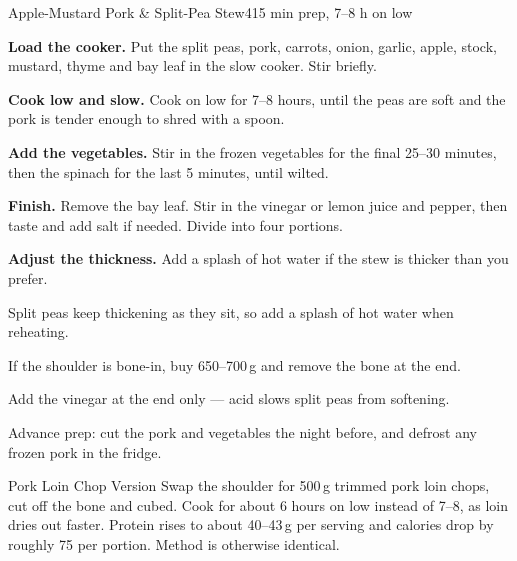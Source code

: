 \begin{recipebox}{Apple-Mustard Pork \& Split-Pea Stew}{4}{15 min prep, 7--8 h on low}
\begin{method}
  \item \textbf{Load the cooker.} Put the split peas, pork, carrots, onion,
        garlic, apple, stock, mustard, thyme and bay leaf in the slow cooker.
        Stir briefly.
  \item \textbf{Cook low and slow.} Cook on low for 7--8 hours, until the peas
        are soft and the pork is tender enough to shred with a spoon.
  \item \textbf{Add the vegetables.} Stir in the frozen vegetables for the final
        25--30 minutes, then the spinach for the last 5 minutes, until wilted.
  \item \textbf{Finish.} Remove the bay leaf. Stir in the vinegar or lemon juice
        and pepper, then taste and add salt if needed. Divide into four portions.
  \item \textbf{Adjust the thickness.} Add a splash of hot water if the stew is
        thicker than you prefer.
\end{method}

\begin{notelist}
  \item Split peas keep thickening as they sit, so add a splash of hot water
        when reheating.
  \item If the shoulder is bone-in, buy 650--700\,g and remove the bone at the end.
  \item Add the vinegar at the end only --- acid slows split peas from softening.
  \item Advance prep: cut the pork and vegetables the night before, and defrost
        any frozen pork in the fridge.
\end{notelist}

\begin{variationbox}{Pork Loin Chop Version}
Swap the shoulder for 500\,g trimmed pork loin chops, cut off the bone and
cubed. Cook for about 6 hours on low instead of 7--8, as loin dries out faster.
Protein rises to about 40--43\,g per serving and calories drop by roughly 75 per
portion. Method is otherwise identical.
\end{variationbox}

\end{recipebox}
